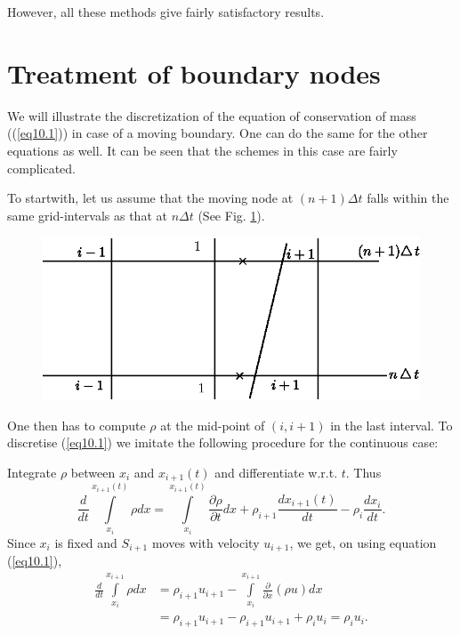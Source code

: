 However, all these methods give fairly satisfactory results.

\section{Treatment of boundary nodes}\label{chap10:sec10.3}
We will illustrate the discretization of the equation of conservation of mass ((\ref{eq10.1})) in case of a moving boundary. One can do the same for the other equations as well. It can be seen that the schemes in this case are fairly complicated.

To start\pageoriginale with, let us assume that the moving node at
$(n+1)\Delta t$ falls within the same grid-intervals as that at
$n\Delta t$ (See Fig. \ref{c10:fig10.1}). 

\begin{figure}[H]
\centering
\includegraphics{figures/fig52-10.1.eps}
\caption{}\label{c10:fig10.1}
\end{figure}

One then has to compute $\rho$ at the mid-point of $(i, i +1)$ in the last interval. To discretise (\ref{eq10.1}) we imitate the following procedure for the continuous case:

Integrate $\rho$ between $x_i$ and $x_{i+1}(t)$ and differentiate w.r.t. $t$. Thus 
$$
\frac{d}{dt} \int\limits^{x_{i+1} (t)}_{x_i} \rho dx = \int\limits^{x_{i+1} (t)}_{x_i} \frac{\partial \rho}{\partial t} dx + \rho_{i+1} \frac{dx_{i+1} (t)}{dt} - \rho_i \frac{dx_i}{dt}. 
$$
Since $x_i$ is fixed and $S_{i+1}$ moves with velocity $u_{i+1}$, we get, on using equation (\ref{eq10.1}),
\begin{align*}
\frac{d}{dt} \int\limits^{x_{i+1}}_{x_i}\rho dx & = \rho_{i+1} u_{i+1} - \int\limits^{x_{i+1}}_{x_i} \frac{\partial}{\partial x} (\rho u) dx\\
& = \rho_{i+1} u_{i+1} - \rho_{i+1} u_{i+1} + \rho_{i} u_i = \rho_i u_i.
\end{align*}


